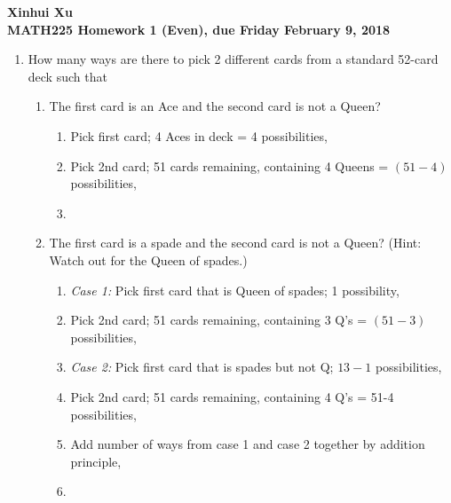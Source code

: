 \documentclass[12pt]{amsart}
\begin{document}
\begin{center}
  \bfseries
  Xinhui Xu\\
  MATH225 Homework 1 (Even), due Friday February 9, 2018
\end{center}

\begin{enumerate}
\item How many ways are there to pick 2 different cards from a standard 52-card deck
such that
    \begin{enumerate}
        \item  The first card is an Ace and the second card is not a Queen?
            \begin{enumerate}
                \item Pick first card; 4 Aces in deck = 4 possibilities,
                \item Pick 2nd card; 51 cards remaining, containing 4 Queens = $(51-4)$ possibilities,
                \item {}
            \end{enumerate}
        \item The first card is a spade and the second card is not a Queen? (Hint: Watch
out for the Queen of spades.)
            \begin{enumerate}
                \item \emph{Case 1:} Pick first card that is Queen of spades; 1 possibility,
                \item Pick 2nd card; 51 cards remaining, containing 3 Q's = $(51-3)$ possibilities,
                \item \emph{Case 2:} Pick first card that is spades but not Q; $13-1$ possibilities,
                \item Pick 2nd card; 51 cards remaining, containing 4 Q's = 51-4 possibilities,
                \item Add number of ways from case 1 and case 2 together by addition principle,
                \item {}
                
            \end{enumerate}
    \end{enumerate}




\end{enumerate}
\end{document}

